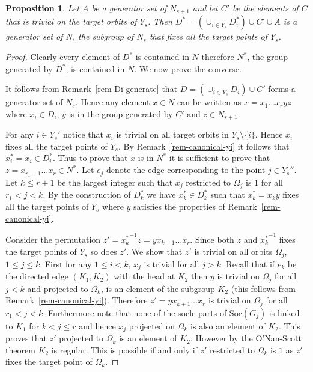 \documentclass[11pt]{madras}%
\newtheorem{proposition}[theorem]{Proposition}
\theoremstyle{remark}
\newcommand{\Soc}[1]{{\ensuremath{\mathrm{Soc}\left(#1\right)}}}
\begin{document}
\begin{proposition}
  Let $A$ be a generator set of $N_{s+1}$ and let $C'$ be the elements
  of $C$ that is trivial on the target orbits of $Y_s$. Then $D^* =
  (\cup_{i \in Y_s} D_i^*) \cup C' \cup A$ is a generator set of $N$,
  the subgroup of $N_s$ that fixes all the target points of $Y_s$.
\end{proposition}
\begin{proof}

  Clearly every element of $D^*$ is contained in $N$ therefore $N^*$,
  the group generated by $D^*$, is contained in $N$. We now prove the
  converse.

  It follows from Remark~\ref{rem-Di-generate} that $ D = (\cup_{i \in
    Y_s} D_i) \cup C'$ forms a generator set of $N_s$. Hence any
  element $x \in N$ can be written as $x = x_1\ldots x_{r} y z$ where
  $x_i \in D_i$, $y$ is in the group generated by $C'$ and $z \in
  N_{s+1}$.
  
  For any $i \in Y_s'$ notice that $x_i$ is trivial on all target
  orbits in $Y_s \setminus \{ i \}$. Hence $x_i$ fixes all the target
  points of $Y_s$. By Remark~\ref{rem-canonical-yi} it follows that
  $x_i^* = x_i \in D_i^*$. Thus to prove that $x$ is in $N^*$ it is
  sufficient to prove that $z = x_{r_1 +1} \ldots x_r \in N^*$.  Let
  $e_j$ denote the edge corresponding to the point $j \in Y_s''$.  Let
  $k\leq r+1$ be the largest integer such that $x_j$ restricted to
  $\Omega_j$ is $1$ for all $r_1 < j < k$.  By the construction of
  $D_k^*$ we have $x_k^* \in D_k^*$ such that $x_k^* = x_k y$ fixes
  all the target points of $Y_s$ where $y$ satisfies the properties of
  Remark~\ref{rem-canonical-yi}.

  Consider the permutation $z' ={x_k^*}^{-1}z= y x_{k+1} \ldots x_r$.
  Since both $z$ and ${x_k^*}^{-1}$ fixes the target points of $Y_s$
  so does $z'$. We show that $z'$ is trivial on all orbits $\Omega_j$,
  $1\leq j \leq k$. First for any $1 \leq i < k$, $x_j$ is trivial for
  all $j > k$.  Recall that if $e_k$ be the directed edge $(K_1,K_2)$
  with the head at $K_2$ then $y$ is trivial on $\Omega_j$ for all $j
  < k$ and projected to $\Omega_k$, is an element of the subgroup
  $K_2$ (this follows from Remark~\ref{rem-canonical-yi}).  Therefore
  $z' = yx_{k+1}\ldots x_r$ is trivial on $\Omega_j$ for all $r_1 < j
  < k$.  Furthermore note that none of the socle parts of $\Soc{G_j}$
  is linked to $K_1$ for $k < j \leq r$ and hence $x_j$ projected on
  $\Omega_k$ is also an element of $K_2$. This proves that $z'$
  projected to $\Omega_k$ is an element of $K_2$. However by the
  O'Nan-Scott theorem $K_2$ is regular. This is possible if and only
  if $z'$ restricted to $\Omega_k$ is $1$ as $z'$ fixes the target
  point of $\Omega_k$.


\end{proof}
\end{document}
